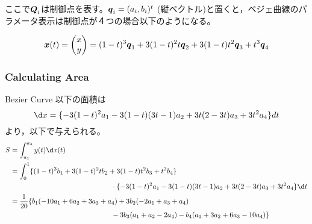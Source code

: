 \documentclass{ltjsarticle}
\begin{document}
ここで$\vb*{Q}_i$は制御点を表す。$\vb*{q}_i=(a_i,b_i)^t$ (縦ベクトル)と置くと，ベジェ曲線のパラメータ表示は制御点が４つの場合以下のようになる。

\begin{equation}
  \vb*{x}(t)=
  \begin{pmatrix}
    x \\ y
  \end{pmatrix}
  =(1-t)^3\vb*{q}_1+3(1-t)^2t\vb*{q}_2+3(1-t)t^2\vb*{q}_3+t^3\vb*{q}_4
\end{equation}
\subsubsection{Calculating Area}
Bezier Curve 以下の面積は
\begin{equation}
  \d x=\{-3(1-t)^2a_1-3(1-t)(3t-1)a_2+3t(2-3t)a_3+3t^2a_4\}dt
\end{equation}
より，以下で与えられる。
\begin{equation}
  \begin{split}
    S & =\int_{a_1}^{a_4}y(t)\d x(t)                                               \\
      & =\int_{0}^{1}\{(1-t)^3b_1+3(1-t)^2tb_2+3(1-t)t^2b_3+t^3b_4\}               \\
      & \hspace{5cm}\cdot \{-3(1-t)^2a_1-3(1-t)(3t-1)a_2+3t(2-3t)a_3+3t^2a_4\}\d t \\
      & =\frac{1}{20}\{b_1(-10a_1+6a_2+3a_3+a_4)+3b_2(-2a_1+a_3+a_4)               \\
      & \hspace{5cm}-3b_3(a_1+a_2-2a_4)-b_4(a_1+3a_2+6a_3-10a_4)\}                 \\
  \end{split}
\end{equation}
\end{document}
